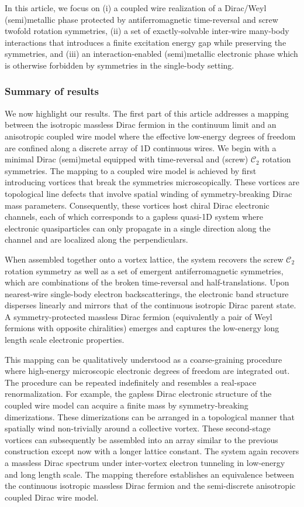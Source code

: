 In this article, we focus on (i) a coupled wire realization of a Dirac/Weyl (semi)metallic phase protected by antiferromagnetic time-reversal and screw twofold rotation symmetries, (ii) a set of exactly-solvable inter-wire many-body interactions that introduces a finite excitation energy gap while preserving the symmetries, and (iii) an interaction-enabled (semi)metallic electronic phase which is otherwise forbidden by symmetries in the single-body setting.

\subsubsection{Summary of results}\label{sec:introsummary}

We now highlight our results. The first part of this article addresses a mapping between the isotropic massless Dirac fermion in the continuum limit and an anisotropic coupled wire model where the effective low-energy degrees of freedom are confined along a discrete array of 1D continuous wires. We begin with a minimal Dirac (semi)metal equipped with time-reversal and (screw) $\mathcal{C}_2$ rotation symmetries. The mapping to a coupled wire model is achieved by first introducing vortices that break the symmetries microscopically. These vortices are topological line defects that involve spatial winding of symmetry-breaking Dirac mass parameters. Consequently, these vortices host chiral Dirac electronic channels, each of which corresponds to a gapless quasi-1D system where electronic quasiparticles can only propagate in a single direction along the channel and are localized along the perpendiculars. 

When assembled together onto a vortex lattice, the system recovers the screw $\mathcal{C}_2$ rotation symmetry as well as a set of emergent antiferromagnetic symmetries, which are combinations of the broken time-reversal and half-translations. Upon nearest-wire single-body electron backscatterings, the electronic band structure disperses linearly and mirrors that of the continuous isotropic Dirac parent state. A symmetry-protected massless Dirac fermion (equivalently a pair of Weyl fermions with opposite chiralities) emerges and captures the low-energy long length scale electronic properties.

This mapping can be qualitatively understood as a coarse-graining procedure where high-energy microscopic electronic degrees of freedom are integrated out. The procedure can be repeated indefinitely and resembles a real-space renormalization. For example, the gapless Dirac electronic structure of the coupled wire model can acquire a finite mass by symmetry-breaking dimerizations. These dimerizations can be arranged in a topological manner that spatially wind non-trivially around a collective vortex. These second-stage vortices can subsequently be assembled into an array similar to the previous construction except now with a longer lattice constant. The system again recovers a massless Dirac spectrum under inter-vortex electron tunneling in low-energy and long length scale. The mapping therefore establishes an equivalence between the continuous isotropic massless Dirac fermion and the semi-discrete anisotropic coupled Dirac wire model.

